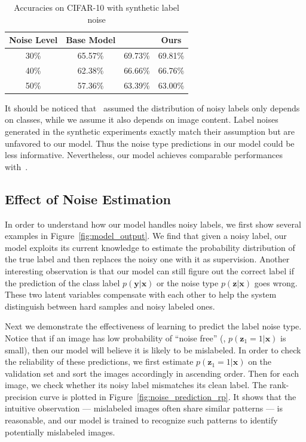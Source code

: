 \documentclass[10pt,twocolumn,letterpaper]{article}
\def\vec{\mathbf}
\begin{document}
\begin{table}
\begin{center}
\begin{tabular}{c|c|c|c}
\hline
Noise Level & Base Model & \cite{sukhbaatar2014learning} & Ours \\
\hline\hline
30\% & 65.57\% & 69.73\% & 69.81\% \\
\hline
40\% & 62.38\% & 66.66\% & 66.76\% \\
\hline
50\% & 57.36\% & 63.39\% & 63.00\% \\
\hline
\end{tabular}
\end{center}
\caption{Accuracies on CIFAR-10 with synthetic label noise}
\label{tab:accuracy_synthetic}
\end{table}

It should be noticed that~\cite{sukhbaatar2014learning} assumed the distribution of noisy labels only depends on classes, while we assume it also depends on image content. Label noises generated in the synthetic experiments exactly match their assumption but are unfavored to our model. Thus the noise type predictions in our model could be less informative. Nevertheless, our model achieves comparable performances with~\cite{sukhbaatar2014learning}.


\subsection{Effect of Noise Estimation} %
\label{sub:effect_of_noise_estimation}
In order to understand how our model handles noisy labels, we first show several examples in Figure~\ref{fig:model_output}. We find that given a noisy label, our model exploits its current knowledge to estimate the probability distribution of the true label and then replaces the noisy one with it as supervision. Another interesting observation is that our model can still figure out the correct label if the prediction of the class label $p(\vec{y}|\vec{x})$ or the noise type $p(\vec{z}|\vec{x})$ goes wrong. These two latent variables compensate with each other to help the system distinguish between hard samples and noisy labeled ones.

Next we demonstrate the effectiveness of learning to predict the label noise type. Notice that if an image has low probability of ``noise free'' (\ie, $p(\vec{z}_1=1|\vec{x})$ is small), then our model will believe it is likely to be mislabeled. In order to check the reliability of these predictions, we first estimate $p(\vec{z}_1=1|\vec{x})$ on the validation set and sort the images accordingly in ascending order. Then for each image, we check whether its noisy label mismatches its clean label. The rank-precision curve is plotted in Figure~\ref{fig:noise_prediction_rp}. It shows that the intuitive observation --- mislabeled images often share similar patterns --- is reasonable, and our model is trained to recognize such patterns to identify potentially mislabeled images.
\end{document}
